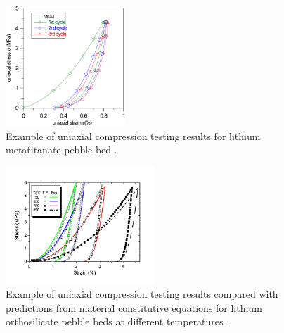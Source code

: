 \begin{figure}[t!]
\begin{center}
\includegraphics[width=0.4\textwidth]{chapters/figures/Fig-1}
\caption{Example of uniaxial compression testing results for lithium metatitanate pebble bed \cite{vanderlaan2011}.}
\label{fig:mti}
\end{center}
\end{figure}

\begin{figure}[t!]
\begin{center}
\includegraphics[width=0.5\textwidth]{chapters/figures/Fig-2}
\caption{Example of uniaxial compression testing results compared with predictions from material constitutive equations for lithium orthosilicate pebble beds at different temperatures \cite{Gan:2008kx}.}
\label{fig:UCT}
\end{center}
\end{figure}

